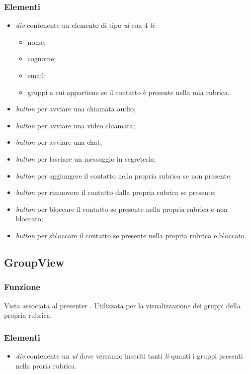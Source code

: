 \subsubsection*{Elementi}
\begin{itemize}
\item \textit{div} contenente un elemento di tipo \textit{ul} con 4 \textit{li}:
\begin{itemize}
\item nome;
\item cognome;
\item email;
\item gruppi a cui appartiene se il contatto è presente nella mia rubrica.
\end{itemize}
\item \textit{button} per avviare una chiamata audio;
\item \textit{button} per avviare una video chiamata;
\item \textit{button} per avviare una chat;
\item \textit{button} per lasciare un messaggio in segreteria;
\item \textit{button} per aggiungere il contatto nella propria rubrica se non presente;
\item \textit{button} per rimuovere il contatto dalla propria rubrica se presente;
\item \textit{button} per bloccare il contatto se presente nella propria rubrica e non bloccato;
\item \textit{button} per sbloccare il contatto se presente nella propria rubrica e bloccato.
\end{itemize}

\subsection{GroupView}
\subsubsection*{Funzione}
Vista associata al presenter . Utilizzata per la visualizzazione dei gruppi della propria rubrica.
\subsubsection*{Elementi}
\begin{itemize}
\item \textit{div} contenente un \textit{ul} dove verranno inseriti tanti \textit{li} quanti i gruppi presenti nella proria rubrica.
\end{itemize}


